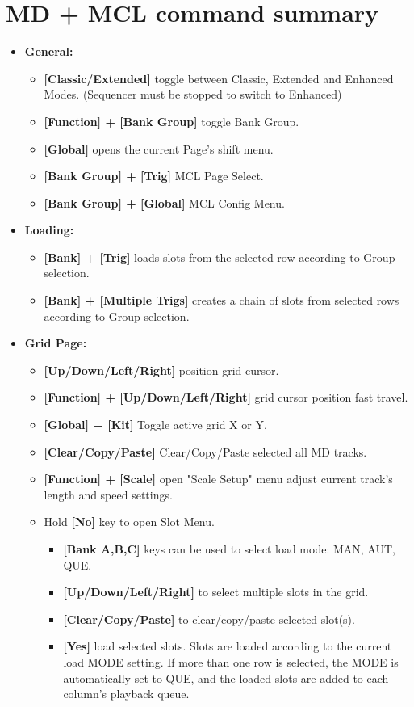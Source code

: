 \section{MD + MCL command summary}
\begin{itemize}
\item \textbf{General:}
   \begin{itemize}
      \item \textbf{[Classic/Extended] } toggle between Classic, Extended and Enhanced Modes. (Sequencer must be stopped to switch to Enhanced)
      \item \textbf{[Function] + [Bank Group]} toggle Bank Group.
      \item \textbf{[Global]} opens the current Page's shift menu.
      \item \textbf{[Bank Group] + [Trig]} MCL Page Select.
      \item \textbf{[Bank Group] + [Global]} MCL Config Menu. 
 \end{itemize}
 
\item \textbf{Loading:}
   \begin{itemize}
      \item \textbf{[Bank] + [Trig]} loads slots from the selected row according to Group selection.
      \item \textbf{[Bank] + [Multiple Trigs]} creates a chain of slots from selected rows according to Group selection.
   \end{itemize}

\item \textbf{Grid Page:}
    \begin{itemize}
      \item \textbf{[Up/Down/Left/Right]} position grid cursor.
      \item \textbf{[Function] + [Up/Down/Left/Right]} grid cursor position fast travel.
      \item \textbf{[Global] + [Kit]} Toggle active grid X or Y. 
      \item \textbf{[Clear/Copy/Paste]} Clear/Copy/Paste selected all MD tracks.
      \item \textbf{[Function] + [Scale]} open "Scale Setup" menu adjust current track's length and speed settings.
      \item Hold \textbf{[No]} key to open Slot Menu.
      \begin{itemize}
                \item \textbf{[Bank A,B,C]} keys can be used to select load mode: MAN, AUT, QUE.
                \item \textbf{[Up/Down/Left/Right]} to select multiple slots in the grid.
                \item \textbf{[Clear/Copy/Paste]} to clear/copy/paste selected slot(s).
                \item \textbf{[Yes]} load selected slots. Slots are loaded according to the current load MODE setting. If more than one row is selected, the MODE is automatically set to QUE, and the loaded slots are added to each column's playback queue.                
      \end{itemize}


\end{itemize}
\end{itemize}
